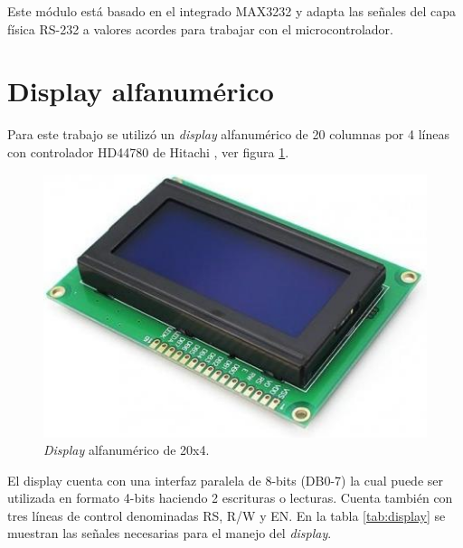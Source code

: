 Este módulo está basado en el integrado MAX3232 \citep{MAX3232} y adapta las señales del capa física RS-232 a valores acordes para trabajar con el microcontrolador.

\section{Display alfanumérico}

Para este trabajo se utilizó un \textit{display} alfanumérico de 20 columnas por 4 líneas con controlador HD44780 de Hitachi \citep{HD44780}, ver figura \ref{fig:display}.

\begin{figure}[htpb]
	\centering
	\includegraphics[scale=0.7]{./Figures/display.jpg}
	\caption{\textit{Display} alfanumérico de 20x4.}
	\label{fig:display}
\end{figure}

El display cuenta con una interfaz paralela de 8-bits (DB0-7) la cual puede ser utilizada en formato 4-bits haciendo 2 escrituras o lecturas. Cuenta también con tres líneas de control denominadas RS, R/W y EN. En la tabla \ref{tab:display} se muestran las señales necesarias para el manejo del \textit{display}.

